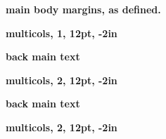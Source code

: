 \documentclass{book}
\begin{document}
\textbf{main body margins, as defined.}
\marginpar{[marginpar]}
\lipsum[1-2]
 \begin{adjmulticols}{1}{12pt}{-2in}
   \textbf{multicols, 1, 12pt, -2in}
  \lipsum[3-4]
\end{adjmulticols}
\textbf{back main text}
\marginpar{[marginpar]}
\lipsum[12-14]
\marginpar{[marginpar]}
 \begin{adjmulticols}{2}{12pt}{-2in}
   \textbf{multicols, 2, 12pt, -2in}
  \lipsum[6-15]
\end{adjmulticols}
\textbf{back main text}
\marginpar{[marginpar]}
\lipsum
\marginpar{[marginpar]}
 \begin{adjmulticols*}{2}{12pt}{-2in}
   \textbf{multicols, 2, 12pt, -2in}
  \lipsum[6-16]
\end{adjmulticols*}
\end{document}

